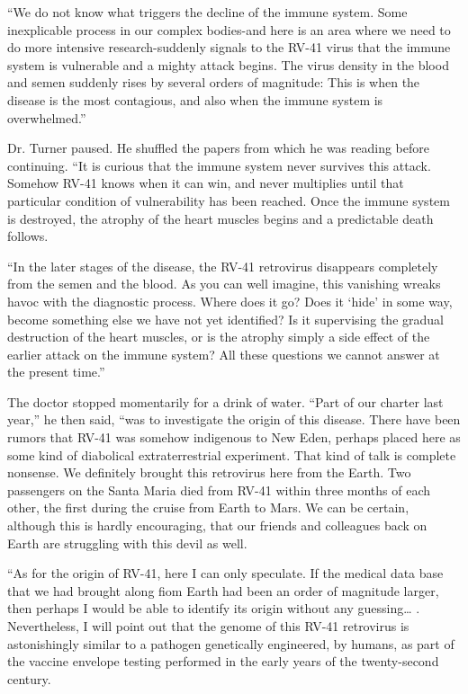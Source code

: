 \documentclass[]{article}
\begin{document}
{“We do not know what triggers the decline of the immune system. Some inexplicable process in our complex bodies-and here is an area where we need to do more intensive research-suddenly signals to the RV-41 virus that the immune system is vulnerable and a mighty attack begins. The virus density in the blood and semen suddenly rises by several orders of magnitude: This is when the disease is the most contagious, and also when the immune system is overwhelmed.”

Dr. Turner paused. He shuffled the papers from which he was reading before continuing. “It is curious that the immune system never survives this attack. Somehow RV-41 knows when it can win, and never multiplies until that particular condition of vulnerability has been reached. Once the immune system is destroyed, the atrophy of the heart muscles begins and a predictable death follows.

“In the later stages of the disease, the RV-41 retrovirus disappears completely from the semen and the blood. As you can well imagine, this vanishing wreaks havoc with the diagnostic process. Where does it go? Does it ‘hide’ in some way, become something else we have not yet identified? Is it supervising the gradual destruction of the heart muscles, or is the atrophy simply a side effect of the earlier attack on the immune system? All these questions we cannot answer at the present time.”

The doctor stopped momentarily for a drink of water. “Part of our charter last year,” he then said, “was to investigate the origin of this disease. There have been rumors that RV-41 was somehow indigenous to New Eden, perhaps placed here as some kind of diabolical extraterrestrial experiment. That kind of talk is complete nonsense. We definitely brought this retrovirus here from the Earth. Two passengers on the Santa Maria died from RV-41 within three months of each other, the first during the cruise from Earth to Mars. We can be certain, although this is hardly encouraging, that our friends and colleagues back on Earth are struggling with this devil as well.

“As for the origin of RV-41, here I can only speculate. If the medical data base that we had brought along fiom Earth had been an order of magnitude larger, then perhaps I would be able to identify its origin without any guessing… . Nevertheless, I will point out that the genome of this RV-41 retrovirus is astonishingly similar to a pathogen genetically engineered, by humans, as part of the vaccine envelope testing performed in the early years of the twenty-second century.

}
\end{document}
